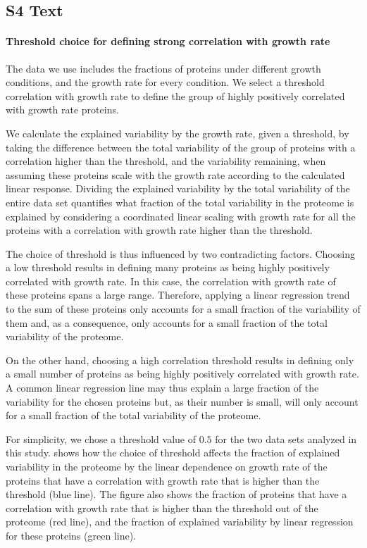 \documentclass[10pt,letterpaper]{article}
\begin{document}
\subsection*{S4 Text}
\label{corrthreshold}
\paragraph{Threshold choice for defining strong correlation with growth rate}
The data we use includes the fractions of proteins under different growth conditions, and the growth rate for every condition.
We select a threshold correlation with growth rate to define the group of highly positively correlated with growth rate proteins.

We calculate the explained variability by the growth rate, given a threshold, by taking the difference between the total variability of the group of proteins with a correlation higher than the threshold, and the variability remaining, when assuming these proteins scale with the growth rate according to the calculated linear response.
Dividing the explained variability by the total variability of the entire data set quantifies what fraction of the total variability in the proteome is explained by considering a coordinated linear scaling with growth rate for all the proteins with a correlation with growth rate higher than the threshold.

The choice of threshold is thus influenced by two contradicting factors.
Choosing a low threshold results in defining many proteins as being highly positively correlated with growth rate.
In this case, the correlation with growth rate of these proteins spans a large range.
Therefore, applying a linear regression trend to the sum of these proteins only accounts for a small fraction of the variability of them and, as a consequence, only accounts for a small fraction of the total variability of the proteome.

On the other hand, choosing a high correlation threshold results in defining only a small number of proteins as being highly positively correlated with growth rate.
A common linear regression line may thus explain a large fraction of the variability for the chosen proteins but, as their number is small, will only account for a small fraction of the total variability of the proteome.

For simplicity, we chose a threshold value of $0.5$ for the two data sets analyzed in this study.
 shows how the choice of threshold affects the fraction of explained variability in the proteome by the linear dependence on growth rate of the proteins that have a correlation with growth rate that is higher than the threshold (blue line).
The figure also shows the fraction of proteins that have a correlation with growth rate that is higher than the threshold out of the proteome (red line), and the fraction of explained variability by linear regression for these proteins (green line).
\end{document}
